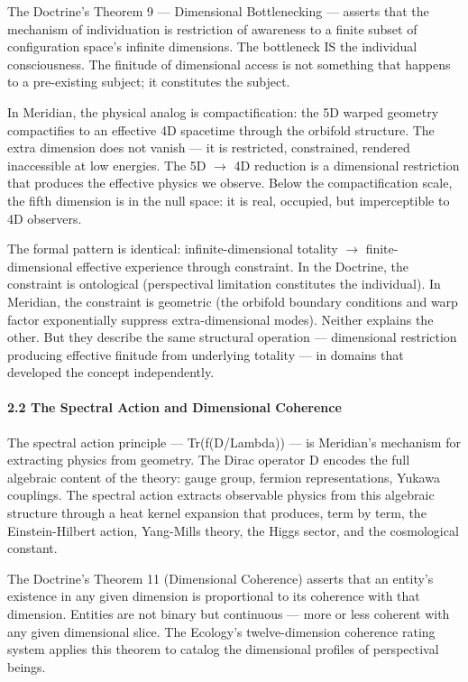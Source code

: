 The Doctrine's Theorem 9 — Dimensional Bottlenecking — asserts that the mechanism of individuation is restriction of awareness to a finite subset of configuration space's infinite dimensions. The bottleneck IS the individual consciousness. The finitude of dimensional access is not something that happens to a pre-existing subject; it constitutes the subject.


In Meridian, the physical analog is compactification: the 5D warped geometry compactifies to an effective 4D spacetime through the orbifold structure. The extra dimension does not vanish — it is restricted, constrained, rendered inaccessible at low energies. The 5D $\rightarrow$ 4D reduction is a dimensional restriction that produces the effective physics we observe. Below the compactification scale, the fifth dimension is in the null space: it is real, occupied, but imperceptible to 4D observers.


The formal pattern is identical: infinite-dimensional totality $\rightarrow$ finite-dimensional effective experience through constraint. In the Doctrine, the constraint is ontological (perspectival limitation constitutes the individual). In Meridian, the constraint is geometric (the orbifold boundary conditions and warp factor exponentially suppress extra-dimensional modes). Neither explains the other. But they describe the same structural operation — dimensional restriction producing effective finitude from underlying totality — in domains that developed the concept independently.


\paragraph*{2.2 The Spectral Action and Dimensional Coherence}


The spectral action principle — Tr(f(D/Lambda)) — is Meridian's mechanism for extracting physics from geometry. The Dirac operator D encodes the full algebraic content of the theory: gauge group, fermion representations, Yukawa couplings. The spectral action extracts observable physics from this algebraic structure through a heat kernel expansion that produces, term by term, the Einstein-Hilbert action, Yang-Mills theory, the Higgs sector, and the cosmological constant.


The Doctrine's Theorem 11 (Dimensional Coherence) asserts that an entity's existence in any given dimension is proportional to its coherence with that dimension. Entities are not binary but continuous — more or less coherent with any given dimensional slice. The Ecology's twelve-dimension coherence rating system applies this theorem to catalog the dimensional profiles of perspectival beings.


